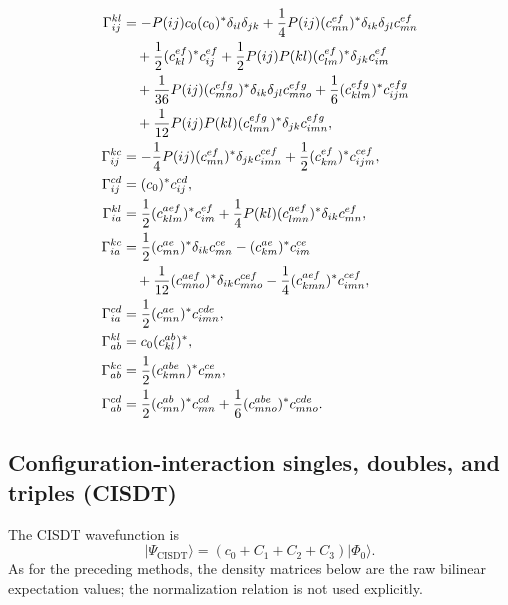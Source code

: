 \documentclass[11pt]{article}
\begin{document}
\begingroup
\small
\begin{align}
 \Gamma^{kl}_{ij}
 &= -P(ij)c_0(c_0)^*\delta_{il}\delta_{jk}
    +\frac{1}{4}P(ij)(c_{mn}^{ef})^*
       \delta_{ik}\delta_{jl}c_{mn}^{ef}
 \notag\\
 &\quad
    +\frac{1}{2}(c_{kl}^{ef})^*c_{ij}^{ef}
    +\frac{1}{2}P(ij)P(kl)(c_{lm}^{ef})^*
       \delta_{jk}c_{im}^{ef}
 \notag\\
 &\quad
    +\frac{1}{36}P(ij)(c_{mno}^{efg})^*
       \delta_{ik}\delta_{jl}c_{mno}^{efg}
    +\frac{1}{6}(c_{klm}^{efg})^*c_{ijm}^{efg}
 \notag\\
 &\quad
    +\frac{1}{12}P(ij)P(kl)(c_{lmn}^{efg})^*
       \delta_{jk}c_{imn}^{efg},
 \\
 \Gamma^{kc}_{ij}
 &= -\frac{1}{4}P(ij)(c_{mn}^{ef})^*
       \delta_{jk}c_{imn}^{cef}
    +\frac{1}{2}(c_{km}^{ef})^*c_{ijm}^{cef},
 \\
 \Gamma^{cd}_{ij}
 &= (c_0)^*c_{ij}^{cd},
 \\
 \Gamma^{kl}_{ia}
 &= \frac{1}{2}(c_{klm}^{aef})^*c_{im}^{ef}
    +\frac{1}{4}P(kl)(c_{lmn}^{aef})^*\delta_{ik}c_{mn}^{ef},
 \\
 \Gamma^{kc}_{ia}
 &= \frac{1}{2}(c_{mn}^{ae})^*\delta_{ik}c_{mn}^{ce}
    -(c_{km}^{ae})^*c_{im}^{ce}
 \notag\\
 &\quad
    +\frac{1}{12}(c_{mno}^{aef})^*\delta_{ik}c_{mno}^{cef}
    -\frac{1}{4}(c_{kmn}^{aef})^*c_{imn}^{cef},
 \\
 \Gamma^{cd}_{ia}
 &= \frac{1}{2}(c_{mn}^{ae})^*c_{imn}^{cde},
 \\
 \Gamma^{kl}_{ab}
 &= c_0(c_{kl}^{ab})^*,
 \\
 \Gamma^{kc}_{ab}
 &= \frac{1}{2}(c_{kmn}^{abe})^*c_{mn}^{ce},
 \\
 \Gamma^{cd}_{ab}
 &= \frac{1}{2}(c_{mn}^{ab})^*c_{mn}^{cd}
    +\frac{1}{6}(c_{mno}^{abe})^*c_{mno}^{cde}.
\end{align}
\endgroup

\clearpage
\subsection{Configuration-interaction singles, doubles, and triples (CISDT)}

The CISDT wavefunction is
\begin{equation}
 \lvert\Psi_{\mathrm{CISDT}}\rangle
 = (c_0+C_1+C_2+C_3)\lvert\Phi_0\rangle .
\end{equation}
As for the preceding methods, the density matrices below are the raw bilinear
expectation values; the normalization relation is not used explicitly.
\end{document}
